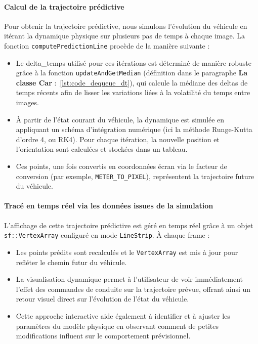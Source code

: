 \paragraph{Calcul de la trajectoire prédictive}
Pour obtenir la trajectoire prédictive, nous simulons l'évolution du véhicule en itérant la dynamique physique sur plusieurs pas de temps à chaque image.
La fonction \texttt{computePredictionLine} procède de la manière suivante :
\begin{itemize}
    \item Le \gls{delta_temps} utilisé pour ces itérations est déterminé de manière robuste grâce à la fonction \texttt{updateAndGetMedian} (définition dans le paragraphe \textbf{La classe Car} :~\ref{lst:code_dequeue_dt}), qui calcule la médiane des deltas de temps récents afin de lisser les variations liées à la volatilité du temps entre images.
    \item À partir de l'état courant du véhicule, la dynamique est simulée en appliquant un schéma d'intégration numérique (ici la méthode Runge-Kutta d'ordre 4, ou RK4).
    Pour chaque itération, la nouvelle position et l'orientation sont calculées et stockées dans un tableau.
    \item Ces points, une fois convertis en coordonnées écran via le facteur de conversion (par exemple, \texttt{METER\_TO\_PIXEL}), représentent la trajectoire future du véhicule.
\end{itemize}

\paragraph{Tracé en temps réel via les données issues de la simulation}
L'affichage de cette trajectoire prédictive est géré en temps réel grâce à un objet \texttt{sf::VertexArray}\cite{sfml_sf_vertexarray} configuré en mode \texttt{LineStrip}.
À chaque frame :
\begin{itemize}
    \item Les points prédits sont recalculés et le \texttt{VertexArray} est mis à jour pour refléter le chemin futur du véhicule.
    \item La visualisation dynamique permet à l'utilisateur de voir immédiatement l'effet des commandes de conduite sur la trajectoire prévue, offrant ainsi un retour visuel direct sur l'évolution de l'état du véhicule.
    \item Cette approche interactive aide également à identifier et à ajuster les paramètres du modèle physique en observant comment de petites modifications influent sur le comportement prévisionnel.
\end{itemize}

